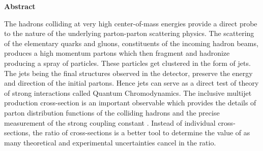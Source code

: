 \begin{center}
{\bf \huge Abstract}
\end{center}

The hadrons colliding at very high center-of-mass energies provide a direct probe to the nature of the underlying parton-parton scattering physics. The scattering of the elementary quarks and gluons, constituents of the incoming hadron beams, produces a high momentum partons which then fragment and hadronize producing a spray of particles. These particles get clustered in the form of jets. The jets being the final structures observed in the detector, preserve the energy and direction of the initial partons. Hence jets can serve as a direct test of theory of strong interactions called Quantum Chromodynamics. The inclusive multijet production cross-section is an important observable which provides the details of parton distribution functions of the colliding hadrons and the precise measurement of the strong coupling constant \alps. Instead of individual cross-sections, the ratio of cross-sections is a better tool to determine the value of \alps as many theoretical and experimental uncertainties cancel in the ratio.

